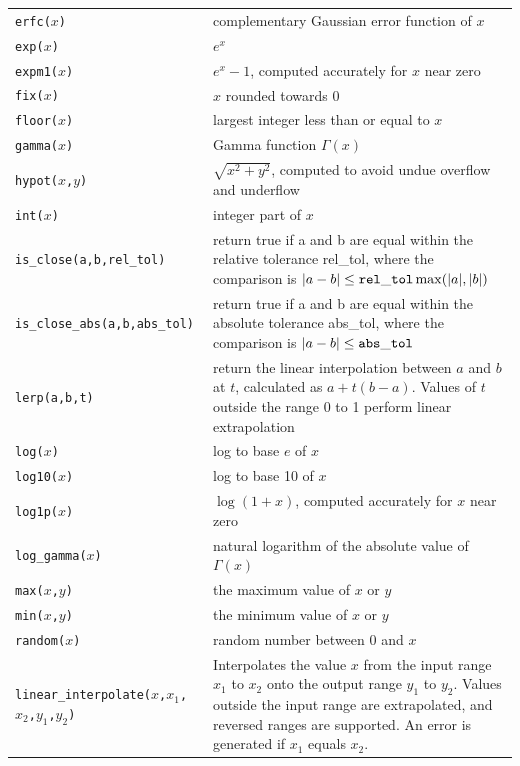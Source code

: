 \begin{supertabular}{lp{10cm}}
  {\tt erfc($x$)}  & complementary Gaussian error function of $x$ \\
  {\tt exp($x$)}  & $e^x$ \\
  {\tt expm1($x$)}  & $e^x-1$, computed accurately for $x$ near zero \\
  {\tt fix($x$)}  & $x$ rounded towards 0 \\
  {\tt floor($x$)}  & largest integer less than or equal to $x$ \\
  {\tt gamma($x$)}  & Gamma function $\Gamma(x)$ \\
  {\tt hypot($x$,$y$)}  & $\sqrt{x^2+y^2}$, computed to avoid undue overflow and underflow \\
  {\tt int($x$)}  & integer part of $x$ \\
  {\tt is\_close(a,b,rel\_tol)}  & return true if a and b are equal within the relative tolerance rel\_tol, where the comparison is $|a-b| \leq {\tt rel\_tol}\max(|a|,|b|)$ \\
  {\tt is\_close\_abs(a,b,abs\_tol)}  & return true if a and b are equal within the absolute tolerance abs\_tol, where the comparison is $|a-b| \leq {\tt abs\_tol}$ \\
  {\tt lerp(a,b,t)}  & return the linear interpolation between $a$ and $b$ at $t$, calculated as $a+t(b-a)$. Values of $t$ outside the range 0 to 1 perform linear extrapolation \\
  {\tt log($x$)}  & log to base $e$ of $x$ \\
  {\tt log10($x$)}  & log to base 10 of $x$ \\
  {\tt log1p($x$)}  & $\log(1+x)$, computed accurately for $x$ near zero \\
  {\tt log\_gamma($x$)}  & natural logarithm of the absolute value of $\Gamma(x)$ \\
  {\tt max($x$,$y$)}  & the maximum value of $x$ or $y$ \\
  {\tt min($x$,$y$)}  & the minimum value of $x$ or $y$ \\
  {\tt random($x$)}  & random number between 0 and $x$ \\
  {\tt linear\_interpolate($x$,$x_1$,$x_2$,$y_1$,$y_2$)}  & Interpolates the value $x$ from the input range $x_1$ to $x_2$ onto the output range $y_1$ to $y_2$. Values outside the input range are extrapolated, and reversed ranges are supported. An error is generated if $x_1$ equals $x_2$. \\

\end{supertabular}
